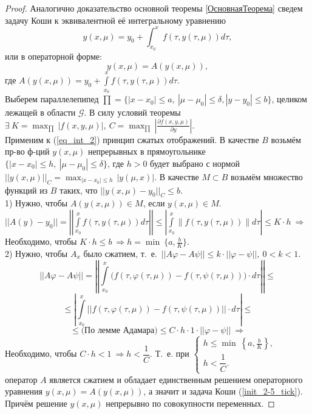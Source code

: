 \begin{proof}
    Аналогично доказательство основной теоремы \ref{ОсновнаяТеорема} сведем задачу Коши к эквивалентной её интегральному уравнению 
    \begin{equation}\label{eq_int_1}
        y(x, \mu) = y_0 + \int_{x_0}^{x} f(\tau, y(\tau, \mu)) d\tau,
    \end{equation}
    или в операторной форме:
    \begin{equation}\label{eq_int_2}
        y(x, \mu) = A(y(x, \mu)),
    \end{equation}
    где $\displaystyle A(y(x, \mu)) = y_0 + \int\limits_{x_0}^{x} f(\tau, y(\tau, \mu)) d\tau$.\\
    Выберем параллелепипед $\prod = \{ |x - x_0| \leqslant a,\ |\mu - \mu_0| \leqslant \delta, |y - y_0| \leqslant b\}$, целиком лежащей в области $\mathcal{G}$. В силу условий теоремы $\displaystyle \exists\ K = \max_{\prod \ }|f(x, y, \mu)|,\ C = \max_{\prod \ } \left| \frac{\partial f(x, y, \mu)}{\partial y} \right|$.\\ 
    Применим к (\ref{eq_int_2}) принцип сжатых отображений. В качестве $B$ возьмём пр-во ф-ций $y(x, \mu)$ непрерывных в прямоугольнике $\{|x - x_0| \leqslant h,\ |\mu - \mu_0| \leqslant \delta\}$, где $h > 0$ будет выбрано с нормой $\displaystyle||y(x, \mu)||_C = \max_{|x - x_0| \leqslant h\ } |y (\mu, x)|$. В качестве $M \subset B$ возьмём множество функций из $B$ таких, что $||y(x, \mu) - y_0||_C \leqslant b$.\\
    1) Нужно, чтобы $A(y(x, \mu)) \in M$, если $y(x, \mu) \in M$. $||A(y) - y_0|| = \left|\left|\displaystyle \int\limits_{x_0}^{x} f(\tau, y(\tau, \mu)) d\tau \right|\right| \leqslant \displaystyle \left|\int\limits_{x_0}^{x} \| f(\tau, y(\tau, \mu)) \| d\tau\right| \leqslant K \cdot h\ \Rightarrow$ Необходимо, чтобы $K\cdot h \leqslant b\ \Rightarrow h = \min\ \{a, \frac{b}{K}\}$. \\
    2) Нужно, чтобы $A_x$ было сжатием, т.\ е.\ $||A\varphi - A\psi|| \leqslant k \cdot ||\varphi - \psi||,\ 0 < k < 1$. \\
    $$||A\varphi - A\psi|| = \left|\left|\displaystyle\int\limits_{x_0}^{x} \Big( f(\tau, \varphi(\tau, \mu)) - f(\tau, \psi(\tau, \mu)) \Big) \cdot d\tau \right|\right| \leqslant $$
    $$ \leqslant \left|\displaystyle \int\limits_{x_0}^{x} ||f(\tau, \varphi(\tau, \mu)) - f(\tau, \psi(\tau, \mu))|| \cdot d\tau \right| \leqslant $$ 
    $$ \leqslant \text{(По лемме Адамара)} \leqslant C\cdot h\cdot 1\cdot ||\varphi - \psi||\ \Rightarrow$$
    Необходимо, чтобы $C\cdot h < 1\ \Rightarrow h < \dfrac{1}{C}$.
    Т.\ е. при 
    $\begin{cases} 
        h \leqslant \min ~ \left \{a, \frac{b}{K} \right \}, \\
        h < \dfrac{1}{C}. 
    \end{cases}$
    оператор $A$ является сжатием и обладает единственным решением операторного уравнения $y(x, \mu) = A(y(x, \mu))$, а значит и задача Коши (\ref{init_2-5_tick}). Причём решение $y(x, \mu)$ непрерывно по совокупности переменных.
\end{proof}
